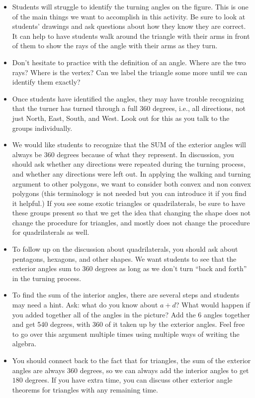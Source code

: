 \documentclass[nooutcomes, noauthor]{ximera}
\begin{document}
\begin{instructorNotes}
\begin{itemize}
	\item Students will struggle to identify the turning angles on the figure. This is one of the main things we want to accomplish in this activity. Be sure to look at students' drawings and ask questions about how they know they are correct. It can help to have students walk around the triangle with their arms in front of them to show the rays of the angle with their arms as they turn.
	\item Don't hesitate to practice with the definition of an angle. Where are the two rays? Where is the vertex? Can we label the triangle some more until we can identify them exactly?
	\item Once students have identified the angles, they may have trouble recognizing that the turner has turned through a full 360 degrees, i.e., all directions, not just North, East, South, and West. Look out for this as you talk to the groups individually.
	\item We would like students to recognize that the SUM of the exterior angles will always be $360$ degrees because of what they represent.  In discussion, you should ask whether any directions were repeated during the turning process, and whether any directions were left out. In applying the walking and turning argument to other polygons, we want to consider both convex and non convex polygons (this terminology is not needed but you can introduce it if you find it helpful.)  If you see some exotic triangles or quadrilaterals, be sure to have these groups present so that we get the idea that changing the shape does not change the procedure for triangles, and mostly does not change the procedure for quadrilaterals as well.
	\item To follow up on the discussion about quadrilaterals, you should ask about pentagons, hexagons, and other shapes. We want students to see that the exterior angles sum to $360$ degrees as long as we don't turn ``back and forth'' in the turning process.
	\item To find the sum of the interior angles, there are several steps and students may need a hint.  Ask: what do you know about $a+d$?  What would happen if you added together all of the angles in the picture?  Add the 6 angles together and get 540 degrees, with 360 of it taken up by the exterior angles. Feel free to go over this argument multiple times using multiple ways of writing the algebra.
	\item You should connect back to the fact that for triangles, the sum of the exterior angles are always $360$ degrees, so we can always add the interior angles to get $180$ degrees.  If you have extra time, you can discuss other exterior angle theorems for triangles with any remaining time.
\end{itemize}







\end{instructorNotes}
\end{document}
